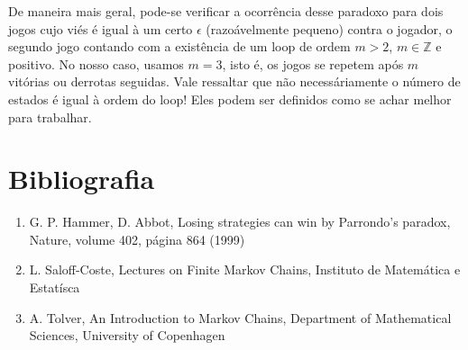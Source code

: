 \documentclass[12pt]{article}
\begin{document}
De maneira mais geral, pode-se verificar a ocorrência desse paradoxo para dois jogos cujo viés é igual à um certo $\epsilon$ (razoávelmente pequeno) contra o jogador, o segundo jogo contando com a existência de um loop de ordem $m > 2$, $m \in \mathbb{Z}$ e positivo. No nosso caso, usamos $m = 3$, isto é, os jogos se repetem após $m$ vitórias ou derrotas seguidas. Vale ressaltar que não necessáriamente o número de estados é igual à ordem do loop! Eles podem ser definidos como se achar melhor para trabalhar.

\section*{Bibliografia}
\begin{enumerate}
	\item G. P. Hammer, D. Abbot, Losing strategies can win
by Parrondo’s paradox, Nature, volume 402, página 864 (1999)

	\item L. Saloff-Coste, Lectures on Finite Markov Chains, Instituto de Matemática e Estatísca
	
	\item A. Tolver, An Introduction to Markov Chains, Department of Mathematical Sciences, University of Copenhagen
\end{enumerate}
\end{document}
